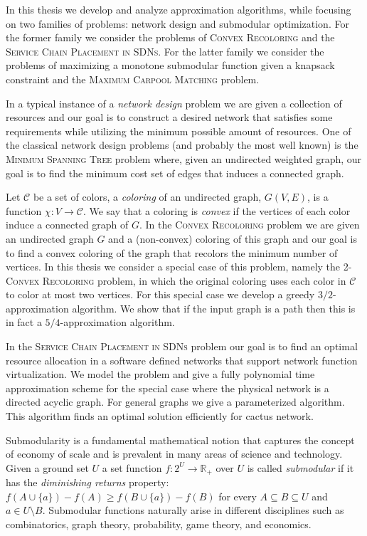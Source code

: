 In this thesis we develop and analyze approximation algorithms, while focusing on two families of problems: network design and submodular optimization.
For the former family we consider the problems of \textsc{Convex Recoloring} and the \textsc{Service Chain Placement in SDNs}.
For the latter family we consider the problems of maximizing a monotone submodular function given a knapsack constraint and the \textsc{Maximum Carpool Matching} problem.

In a typical instance of a \emph{network design} problem we are given a collection of resources and our goal is to construct a desired network that satisfies some requirements while utilizing the minimum possible amount of resources.
One of the classical network design problems (and probably the most well known) is the \textsc{Minimum Spanning Tree} problem where, given an undirected weighted graph, our goal is to find the minimum cost set of edges that induces a connected graph.

Let $\mathcal{C}$ be a set of colors, a \emph{coloring} of an undirected graph, $G(V, E)$, is a function $\chi:V \to \mathcal{C}$.
We say that a coloring is \emph{convex} if the vertices of each color induce a connected graph of $G$.
In the \textsc{Convex Recoloring} problem we are given an undirected graph $G$ and a (non-convex) coloring of this graph and our goal is to find a convex coloring of the graph that recolors the minimum number of vertices.
In this thesis we consider a special case of this problem, namely the \textsc{2-Convex Recoloring} problem, in which the original coloring uses each color in $\mathcal{C}$ to color at most two vertices.
For this special case we develop a greedy $3/2$-approximation algorithm.
We show that if the input graph is a path then this is in fact a $5/4$-approximation algorithm.

In the \textsc{Service Chain Placement in SDNs} problem our goal is to find an optimal resource allocation in a software defined networks that support network function virtualization.
We model the problem and give a fully polynomial time approximation scheme for the special case where the physical network is a directed acyclic graph. 
For general graphs we give a parameterized algorithm. 
This algorithm finds an optimal solution efficiently for cactus network.

Submodularity is a fundamental mathematical notion that captures the concept of economy of scale and is prevalent in many areas of science and technology.
Given a ground set $U$ a set function $f:2^U \to \mathbb{R}_+$ over $U$ is called \emph{submodular} if it has the \emph{diminishing returns} property:
$f(A \cup \{a\}) - f(A) \geq f(B \cup \{a\}) - f(B)$ for every $A \subseteq B \subseteq U$ and $a \in U \setminus B$.
Submodular functions naturally arise in different disciplines such as combinatorics, graph theory, probability, game theory, and economics.

